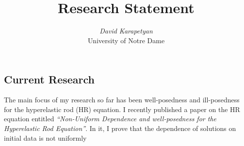\documentclass[12pt,reqno]{amsart}
\newcommand{\rr}{\mathbb{R}}
\newcommand{\ci}{\mathbb{T}}
\newcommand{\p}{\partial}
\begin{document}
\title{Research Statement} 
\author{{\it David Karapetyan}\\
    \/ University of Notre Dame}
\maketitle


\parindent0in
\parskip0.1in
%
%
%
\setcounter{section}{0}
%
%
%
%
%
%
%
%
\subsection{Current Research} 
\label{sec:cur-res}
The main focus of my research so far has been well-posedness and ill-posedness
for the hyperelastic rod (HR) equation.
%
%
I recently published a paper on the HR equation entitled 
{\it ``Non-Uniform Dependence  and well-posedness
for the
Hyperelastic Rod Equation''}. In it, I prove
that 
the dependence of solutions on initial data is not uniformly 
\end{document}
